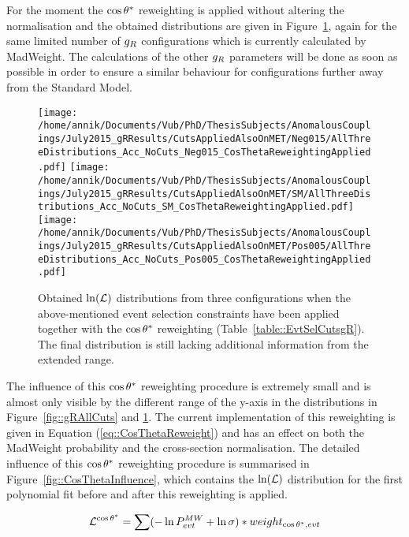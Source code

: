 For the moment the $\cos \theta^{*}$ reweighting is applied without altering the normalisation and the obtained distributions are given in Figure~\ref{fig::gRAllCuts_CosTheta}, again for the same limited number of $g_{R}$ configurations which is currently calculated by MadWeight. The calculations of the other $g_{R}$ parameters will be done as soon as possible in order to ensure a similar behaviour for configurations further away from the Standard Model.
\begin{figure}[h!t]
 \centering
 \texttt{[image: /home/annik/Documents/Vub/PhD/ThesisSubjects/AnomalousCouplings/July2015\_gRResults/CutsAppliedAlsoOnMET/Neg015/AllThreeDistributions\_Acc\_NoCuts\_Neg015\_CosThetaReweightingApplied.pdf]}
 \texttt{[image: /home/annik/Documents/Vub/PhD/ThesisSubjects/AnomalousCouplings/July2015\_gRResults/CutsAppliedAlsoOnMET/SM/AllThreeDistributions\_Acc\_NoCuts\_SM\_CosThetaReweightingApplied.pdf]}
 \texttt{[image: /home/annik/Documents/Vub/PhD/ThesisSubjects/AnomalousCouplings/July2015\_gRResults/CutsAppliedAlsoOnMET/Pos005/AllThreeDistributions\_Acc\_NoCuts\_Pos005\_CosThetaReweightingApplied.pdf]}
 \caption{Obtained $\ln(\mathcal{L})$ distributions from three configurations when the above-mentioned event selection constraints have been applied together with the $\cos \theta^{*}$ reweighting  (Table~\ref{table::EvtSelCutsgR}). The final distribution is still lacking additional information from the extended range.}
 \label{fig::gRAllCuts_CosTheta}
\end{figure}

The influence of this $\cos \theta^{*}$ reweighting procedure is extremely small and is almost only visible by the different range of the y-axis in the distributions in Figure~\ref{fig::gRAllCuts} and \ref{fig::gRAllCuts_CosTheta}. The current implementation of this reweighting is given in Equation (\ref{eq::CosThetaReweight}) and has an effect on both the MadWeight probability and the cross-section normalisation. The detailed influence of this $\cos \theta^{*}$ reweighting procedure is summarised in Figure~\ref{fig::CosThetaInfluence}, which contains the $\ln(\mathcal{L})$ distribution for the first polynomial fit before and after this reweighting is applied.

\begin{equation}\label{eq::CosThetaReweight}
 \mathcal{L}^{\cos \theta^{*}} = \sum (- \ln P^{MW}_{evt} + \ln \sigma) * weight_{\cos \theta^{*},evt}
\end{equation}
\newpage

